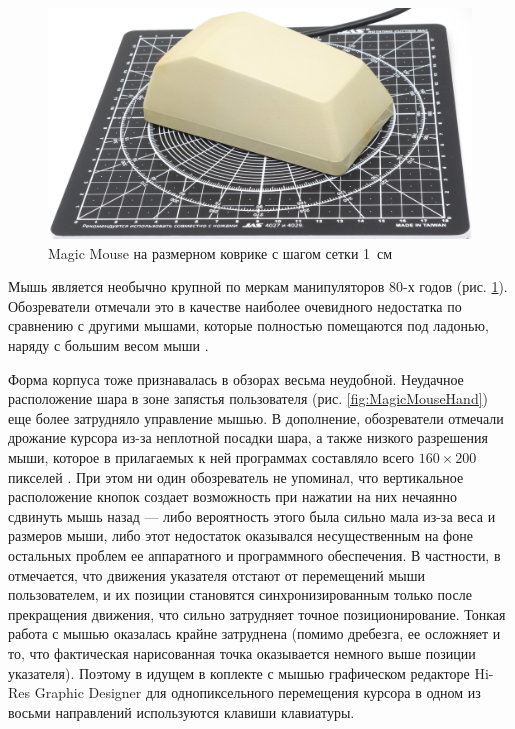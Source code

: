 \documentclass[11pt, a4paper]{article}
\begin{document}
\begin{figure}[h]
    \centering
    \includegraphics[scale=0.51]{1985_smc_contriver_magic_mouse/size_30.jpg}
    \caption{Magic Mouse на размерном коврике с шагом сетки 1~см}
    \label{fig:MagicMouseSize}
\end{figure}

Мышь является необычно крупной по меркам манипуляторов 80-х годов (рис. \ref{fig:MagicMouseSize}). Обозреватели отмечали это в качестве наиболее очевидного недостатка по сравнению с другими мышами, которые полностью помещаются под ладонью, наряду с большим весом мыши \cite{SMC_Mouse_Commodore3}.

Форма корпуса тоже признавалась в обзорах весьма неудобной. Неудачное расположение шара в зоне запястья пользователя (рис. \ref{fig:MagicMouseHand}) еще более затрудняло управление мышью. В дополнение, обозреватели отмечали дрожание курсора из-за неплотной посадки шара, а также низкого разрешения мыши, которое в прилагаемых к ней программах составляло всего $160 \times 200$ пикселей \cite{SMC_Mouse_Commodore3}. При этом ни один обозреватель не упоминал, что вертикальное расположение кнопок создает возможность при нажатии на них нечаянно сдвинуть мышь назад --- либо вероятность этого была сильно мала из-за веса и размеров мыши, либо этот недостаток оказывался несущественным на фоне остальных проблем ее аппаратного и программного обеспечения. В частности, в  \cite{SMC_Mouse_Commodore3} отмечается, что движения указателя отстают от перемещений мыши пользователем, и их позиции становятся синхронизированным только после прекращения движения, что сильно затрудняет точное позиционирование. Тонкая  работа с мышью оказалась крайне затруднена (помимо дребезга, ее осложняет и то, что фактическая нарисованная точка оказывается немного выше позиции указателя). Поэтому в идущем в коплекте с мышью графическом редакторе Hi-Res Graphic Designer для однопиксельного перемещения курсора в одном из восьми направлений используются клавиши клавиатуры.
\end{document}

